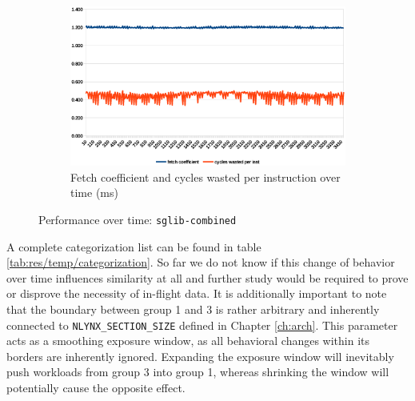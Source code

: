 \documentclass[../bachelor_paper.tex]{subfiles}
\begin{document}
\begin{figure}
\begin{subfigure}{\textwidth}
        \centering
        \includegraphics[height=0.26\textheight]{img/graph/embench/sglib-combined_fetch_waste.eps}
        \caption{Fetch coefficient and cycles wasted per instruction over time (ms)}
        \label{fig:res/sglib/fetch_waste}
    \end{subfigure}
    \caption{Performance over time: \texttt{sglib-combined}}
    \label{fig:res/sglib}
\end{figure}

A complete categorization list can be found in table \ref{tab:res/temp/categorization}. So far we do not know if this change of behavior over time influences similarity at all and further study would be required to prove or disprove the necessity of in-flight data. It is additionally important to note that the boundary between group 1 and 3 is rather arbitrary and inherently connected to \texttt{NLYNX\_SECTION\_SIZE} defined in Chapter \ref{ch:arch}. This parameter acts as a smoothing exposure window, as all behavioral changes within its borders are inherently ignored. Expanding the exposure window will inevitably push workloads from group 3 into group 1, whereas shrinking the window will potentially cause the opposite effect.
\end{document}
